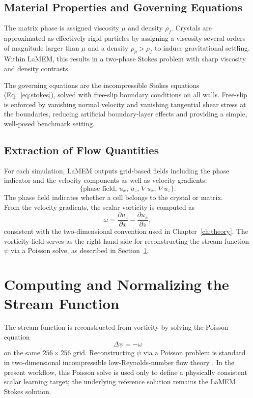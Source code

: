 \subsection{Material Properties and Governing Equations}

The matrix phase is assigned viscosity $\mu$ and density $\rho_f$. Crystals are approximated as effectively rigid particles by assigning a viscosity several orders of magnitude larger than $\mu$ and a density $\rho_p>\rho_f$ to induce gravitational settling. Within LaMEM, this results in a two-phase Stokes problem with sharp viscosity and density contrasts.

The governing equations are the incompressible Stokes equations (Eq.~\ref{eq:stokes}), solved with free-slip boundary conditions on all walls. Free-slip is enforced by vanishing normal velocity and vanishing tangential shear stress at the boundaries, reducing artificial boundary-layer effects and providing a simple, well-posed benchmark setting.

\subsection{Extraction of Flow Quantities}

For each simulation, LaMEM outputs grid-based fields including the phase indicator and the velocity components as well as velocity gradients:
\[
\{\text{phase field},\,u_x,\,u_z,\,\nabla u_x,\,\nabla u_z\}.
\]
The phase field indicates whether a cell belongs to the crystal or matrix.
\\
From the velocity gradients, the scalar vorticity is computed as
\[
\omega=\frac{\partial u_z}{\partial x}-\frac{\partial u_x}{\partial z},
\]
consistent with the two-dimensional convention used in Chapter~\ref{ch:theory}. The vorticity field serves as the right-hand side for reconstructing the stream function $\psi$ via a Poisson solve, as described in Section~\ref{sec:psi}.

\section{Computing and Normalizing the Stream Function}
\label{sec:psi}

The stream function is reconstructed from vorticity by solving the Poisson equation
\[
\Delta\psi=-\omega
\]
on the same $256\times256$ grid. Reconstructing $\psi$ via a Poisson problem is standard in two-dimensional incompressible low-Reynolds-number flow theory \parencite{happel_low_1983}. In the present workflow, this Poisson solve is used only to define a physically consistent scalar learning target; the underlying reference solution remains the LaMEM Stokes solution.

